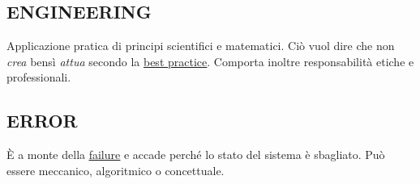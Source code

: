		\subsection{ENGINEERING}  \label{engineering}
		Applicazione pratica di principi scientifici e matematici. Ciò vuol dire che non \textit{crea} bensì \textit{attua} secondo la \underline{\hyperref[best]{best practice}}. Comporta inoltre responsabilità etiche e professionali.
		
		\subsection{ERROR}		\label{error}
		È a monte della \underline{\hyperref[failure]{failure}} e accade perché lo stato del sistema è sbagliato. Può essere meccanico, algoritmico o concettuale.
	
	
